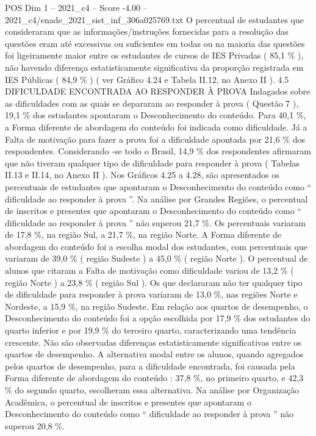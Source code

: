 \begin{textsample}{POS Dim 1 – 2021\_c4 – Score -4.00 – 2021\_c4/enade\_2021\_sist\_inf\_306a025769.txt}
O percentual de estudantes que consideraram que as informações/instruções fornecidas para a resolução das questões eram até excessivas ou suficientes em todas ou na maioria das questões foi ligeiramente maior entre os estudantes de cursos de IES Privadas ( 85,1 \% ), não havendo diferença estatisticamente significativa da proporção registrada em IES Públicas ( 84,9 \% ) ( ver Gráfico 4.24 e Tabela II.12, no Anexo II ). 4.5 DIFICULDADE ENCONTRADA AO RESPONDER À PROVA Indagados sobre as dificuldades com as quais se depararam ao responder à prova ( Questão 7 ), 19,1 \% dos estudantes apontaram o Desconhecimento do conteúdo.
Para 40,1 \%, a Forma diferente de abordagem do conteúdo foi indicada como dificuldade.
Já a Falta de motivação para fazer a prova foi a dificuldade apontada por 21,6 \% dos respondentes.
Considerando -se todo o Brasil, 14,9 \% dos respondentes afirmaram que não tiveram qualquer tipo de dificuldade para responder à prova ( Tabelas II.13 e II.14, no Anexo II ).
Nos Gráficos 4.25 a 4.28, são apresentados os percentuais de estudantes que apontaram o Desconhecimento do conteúdo como “ dificuldade ao responder à prova ”.
Na análise por Grandes Regiões, o percentual de inscritos e presentes que apontaram o Desconhecimento do conteúdo como “ dificuldade ao responder à prova ” não superou 21,7 \%.
Os percentuais variaram de 17,8 \%, na região Sul, a 21,7 \%, na região Norte.
A Forma diferente de abordagem do conteúdo foi a escolha modal dos estudantes, com percentuais que variaram de 39,0 \% ( região Sudeste ) a 45,0 \% ( região Norte ).
O percentual de alunos que citaram a Falta de motivação como dificuldade variou de 13,2 \% ( região Norte ) a 23,8 \% ( região Sul ).
Os que declararam não ter qualquer tipo de dificuldade para responder à prova variaram de 13,0 \%, nas regiões Norte e Nordeste, a 15,9 \%, na região Sudeste.
Em relação aos quartos de desempenho, o Desconhecimento do conteúdo foi a opção escolhida por 17,9 \% dos estudantes do quarto inferior e por 19,9 \% do terceiro quarto, caracterizando uma tendência crescente.
Não são observadas diferenças estatisticamente significativas entre os quartos de desempenho.
A alternativa modal entre os alunos, quando agregados pelos quartos de desempenho, para a dificuldade encontrada, foi causada pela Forma diferente de abordagem do conteúdo : 37,8 \%, no primeiro quarto, e 42,3 \% do segundo quarto, escolheram essa alternativa.
Na análise por Organização Acadêmica, o percentual de inscritos e presentes que apontaram o Desconhecimento do conteúdo como “ dificuldade ao responder à prova ” não superou 20,8 \%.

\end{textsample}
